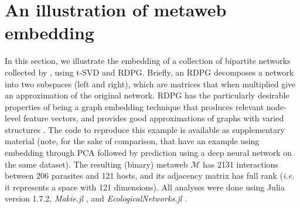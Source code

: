 \section{An illustration of metaweb
embedding}\label{an-illustration-of-metaweb-embedding}

In this section, we illustrate the embedding of a collection of
bipartite networks collected by \cite{Hadfield2014Tale}, using t-SVD and RDPG.
Briefly, an RDPG decomposes a network into two subspaces (left and
right), which are matrices that when multiplied give an approximation of
the original network. RDPG has the particularly desirable properties of
being a graph embedding technique that produces relevant node-level
feature vectors, and provides good approximations of graphs with varied
structures \cite{Athreya2017Statistical}. The code to reproduce this
example is available as supplementary material (note, for the sake of
comparison, that \cite{Strydom2021Roadmap} have an example using embedding
through PCA followed by prediction using a deep neural network on the
same dataset). The resulting (binary) metaweb \(\mathcal{M}\) has 2131
interactions between 206 parasites and 121 hosts, and its adjacency
matrix has full rank (\emph{i.e.} it represents a space with 121
dimensions). All analyses were done using Julia \cite{Bezanson2017Julia}
version 1.7.2, \emph{Makie.jl} \cite{Danisch2021Makie}, and
\emph{EcologicalNetworks.jl} \cite{Poisot2019Ecologicalnetworks}.

